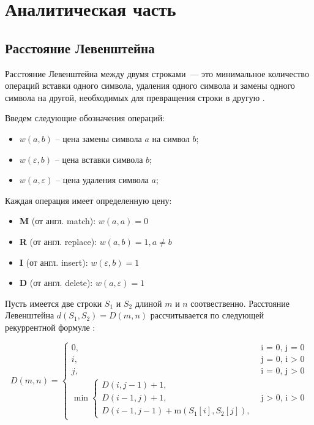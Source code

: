 \chapter{Аналитическая часть}

\section{Расстояние Левенштейна}

Расстояние Левенштейна между двумя строками~--- это минимальное количество операций вставки одного символа, удаления одного символа и замены одного символа на другой, необходимых для превращения строки в другую \cite{analysis-lev-damlev}.

Введем следующие обозначения операций:
\begin{itemize}
    \item $w(a, b)$ -- цена замены символа $a$ на символ $b$;
    \item $w(\varepsilon, b)$ – цена вставки символа $b$; 
    \item $w(a, \varepsilon)$ – цена удаления символа $a$; 
\end{itemize}

Каждая операция имеет определенную цену:
\begin{itemize}
    \item \textbf{M} (от англ. match): $w(a, a) = 0$
    \item \textbf{R} (от англ. replace): $w(a, b) = 1, a \ne b$
    \item \textbf{I} (от англ. insert): $w(\varepsilon, b) = 1$
    \item \textbf{D} (от англ. delete): $w(a, \varepsilon) = 1$
\end{itemize}

Пусть имеется две строки $S_1$ и $S_2$ длиной $m$ и $n$ соотвественно. Расстояние Левенштейна $d(S_1, S_2) = D(m, n)$ рассчитывается по следу\-ющей рекуррентной формуле \cite{prog-impl-lev}:

\begin{equation}
    \label{eqn:recur-lev}
    D(m, n) =
    \begin{cases}
        0, &\text{i = 0, j = 0}\\
        i, &\text{j = 0, i > 0}\\
        j, &\text{i = 0, j > 0}\\
        \min
        \begin{cases}
            D(i, j - 1) + 1,\\
            D(i - 1, j) + 1,\\
            D(i - 1, j - 1) + \text{m}(S_1[i], S_2[j]),
        \end{cases} &\text{j > 0, i > 0}
    \end{cases}
\end{equation}

